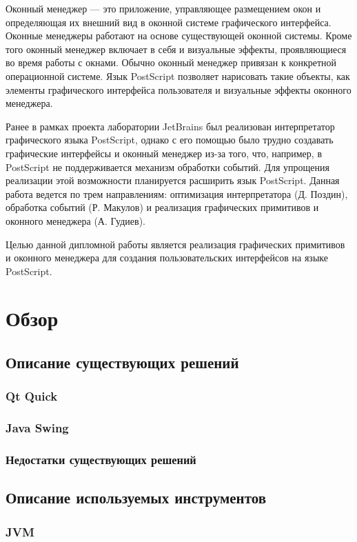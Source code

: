 \documentclass[14pt]{extarticle}
\begin{document}
	Оконный менеджер — это приложение, управляющее размещением окон и определяющая их внешний вид в оконной системе графического интерфейса. Оконные менеджеры работают на основе существующей оконной системы. Кроме того оконный менеджер включает в себя и визуальные эффекты, проявляющиеся во время работы с окнами. Обычно оконный менеджер привязан к конкретной операционной системе. Язык PostScript позволяет нарисовать такие объекты, как элементы графического интерфейса пользователя и визуальные эффекты оконного менеджера.
	
	Ранее в рамках проекта лаборатории JetBrains был реализован интерпретатор графического языка PostScript, однако с его помощью было трудно создавать графические интерфейсы и оконный менеджер из-за того, что, например, в PostScript не поддерживается механизм обработки событий. Для упрощения реализации этой возможности планируется расширить язык PostScript. Данная работа ведется по трем направлениям: оптимизация интерпретатора (Д. Поздин), обработка событий (Р. Макулов) и реализация графических примитивов и оконного менеджера (А. Гудиев).
	
	Целью данной дипломной работы является реализация графических примитивов и оконного менеджера для создания пользовательских интерфейсов на языке PostScript.
	
	\pagebreak
	\section{Обзор}
	\subsection{ Описание существующих решений }
		\subsubsection{Qt Quick}
		\subsubsection{Java Swing}
		\subsubsection{ Недостатки существующих решений }
		
	\subsection{Описание используемых инструментов }
		\subsubsection{JVM}
\end{document}
